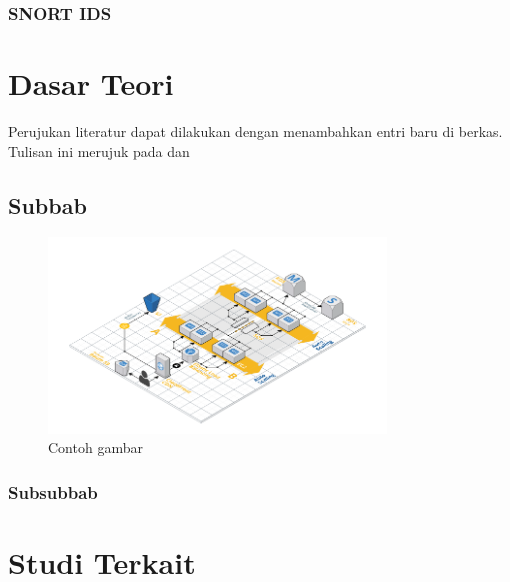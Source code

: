     \subsubsection{SNORT IDS}

\section{Dasar Teori}
Perujukan literatur dapat dilakukan dengan menambahkan entri baru di berkas. Tulisan ini merujuk pada \parencite{knuth2001art} dan \parencite{4026885}

  \subsection{Subbab}

  \blindtext

  \begin{figure}[h]
    \centering
    \includegraphics[width=0.8\textwidth]{resources/chapter-2-infrastructure-diagram.png}
    \caption{Contoh gambar}
  \end{figure}

  \subsubsection{Subsubbab}

  \blindtext

\section{Studi Terkait}
\blindtext
